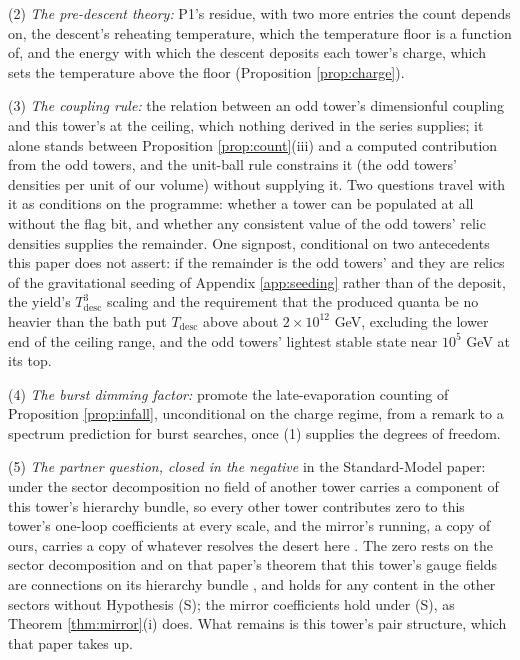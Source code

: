 \documentclass[11pt]{article}
\theoremstyle{definition}
\begin{document}
(2) \emph{The pre-descent theory:} P1's residue, with two more entries the count depends on, the descent's reheating temperature, which the temperature floor is a function of, and the energy with which the descent deposits each tower's charge, which sets the temperature above the floor (Proposition \ref{prop:charge}).

(3) \emph{The coupling rule:} the relation between an odd tower's dimensionful coupling and this tower's at the ceiling, which nothing derived in the series supplies; it alone stands between Proposition \ref{prop:count}(iii) and a computed contribution from the odd towers, and the unit-ball rule constrains it (the odd towers' densities per unit of our volume) without supplying it. Two questions travel with it as conditions on the programme: whether a tower can be populated at all without the flag bit, and whether any consistent value of the odd towers' relic densities supplies the remainder. One signpost, conditional on two antecedents this paper does not assert: if the remainder is the odd towers' and they are relics of the gravitational seeding of Appendix \ref{app:seeding} rather than of the deposit, the yield's $T_{\mathrm{desc}}^{3}$ scaling and the requirement that the produced quanta be no heavier than the bath put $T_{\mathrm{desc}}$ above about $2 \times 10^{12}$ GeV, excluding the lower end of the ceiling range, and the odd towers' lightest stable state near $10^{5}$ GeV at its top.

(4) \emph{The burst dimming factor:} promote the late-evaporation counting of Proposition \ref{prop:infall}, unconditional on the charge regime, from a remark to a spectrum prediction for burst searches, once (1) supplies the degrees of freedom.

(5) \emph{The partner question, closed in the negative} in the Standard-Model paper: under the sector decomposition no field of another tower carries a component of this tower's hierarchy bundle, so every other tower contributes zero to this tower's one-loop coefficients at every scale, and the mirror's running, a copy of ours, carries a copy of whatever resolves the desert here \cite[Prop.~8.5, Cor.~8.6]{ButlerT12}. The zero rests on the sector decomposition and on that paper's theorem that this tower's gauge fields are connections on its hierarchy bundle \cite[Prop.~5.7]{ButlerT12}, and holds for any content in the other sectors without Hypothesis (S); the mirror coefficients hold under (S), as Theorem \ref{thm:mirror}(i) does. What remains is this tower's pair structure, which that paper takes up.
\end{document}
